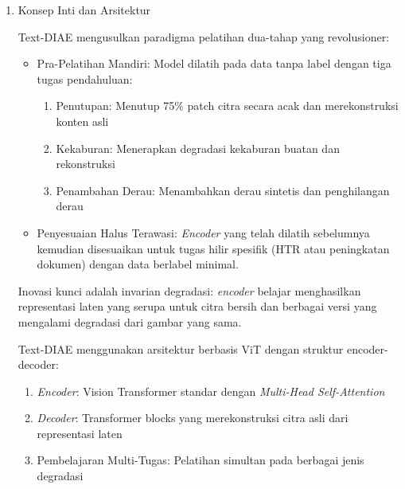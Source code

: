 \documentclass[12pt,a4paper]{article}
\begin{document}
\begin{enumerate}[leftmargin=*, labelsep=0.5em, itemindent=0pt, label=\arabic*., topsep=0pt, partopsep=0pt]

\item Konsep Inti dan Arsitektur

Text-DIAE mengusulkan paradigma pelatihan dua-tahap yang revolusioner:

\begin{itemize}[leftmargin=1.5em]
      \item Pra-Pelatihan Mandiri: Model dilatih pada data tanpa label dengan tiga tugas pendahuluan:
      \begin{enumerate}[leftmargin=1.5em, labelsep=0.5em, itemindent=0pt, label=\alph*., topsep=0pt, parsep=0pt, itemsep=0pt]
            \item Penutupan: Menutup 75\% patch citra secara acak dan merekonstruksi konten asli
            \item Kekaburan: Menerapkan degradasi kekaburan buatan dan rekonstruksi
            \item Penambahan Derau: Menambahkan derau sintetis dan penghilangan derau
      \end{enumerate}
      
      \item Penyesuaian Halus Terawasi: \textit{Encoder} yang telah dilatih sebelumnya kemudian disesuaikan untuk tugas hilir spesifik (HTR atau peningkatan dokumen) dengan data berlabel minimal.
\end{itemize}

Inovasi kunci adalah invarian degradasi: \textit{encoder} belajar menghasilkan representasi laten yang serupa untuk citra bersih dan berbagai versi yang mengalami degradasi dari gambar yang sama.

Text-DIAE menggunakan arsitektur berbasis ViT dengan struktur encoder-decoder:
\begin{enumerate}[leftmargin=1.5em, labelsep=0.5em, itemindent=0pt, label=\alph*., topsep=0pt, parsep=0pt, itemsep=0pt]
      \item \textit{Encoder}: Vision Transformer standar dengan \textit{Multi-Head Self-Attention}
      \item \textit{Decoder}: Transformer blocks yang merekonstruksi citra asli dari representasi laten
      \item Pembelajaran Multi-Tugas: Pelatihan simultan pada berbagai jenis degradasi
\end{enumerate}


\end{enumerate}
\end{document}
